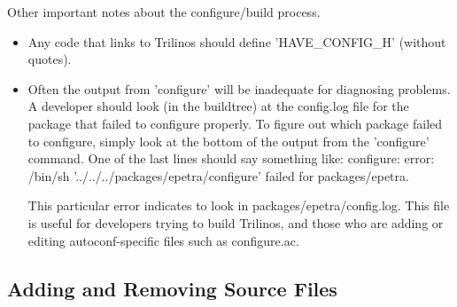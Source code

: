 \documentclass[12pt,relax]{TrilinosDevGuide}
\begin{document}
Other important notes about the configure/build process.
\begin{itemize}
\item Any code that links to Trilinos should define 'HAVE\_CONFIG\_H' (without
quotes).
\item Often the output from 'configure' will be inadequate for diagnosing 
problems.  A developer should look (in the buildtree) at the config.log file 
for the package that failed to configure properly.  To figure out which 
package failed to configure, simply look at the bottom of the output from the 
'configure' command.  One of the last lines should say something like:
configure: error: /bin/sh '../../../packages/epetra/configure' failed 
for packages/epetra.

This particular error indicates to look in packages/epetra/config.log.  This 
file is useful for developers trying to build Trilinos, and those who are 
adding or editing autoconf-specific files such as configure.ac.
\end{itemize}

\subsection{Adding and Removing Source Files}
\end{document}
